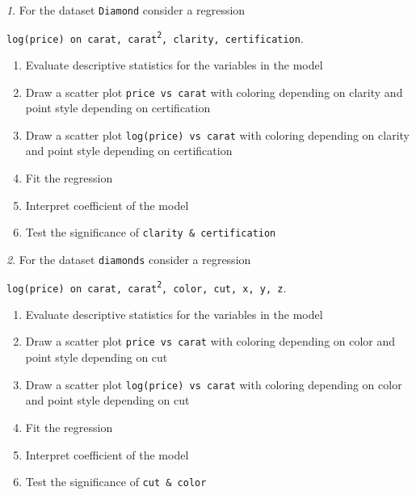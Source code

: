 \documentclass[12pt]{article}
\theoremstyle{remark}
\newtheorem{problem}{}[section]
\begin{document}
\begin{problem}
For the dataset \texttt{Diamond} consider a regression
\begin{center}
	\texttt{log(price) on carat, carat\textsuperscript{2}, clarity, certification}.
\end{center}
\begin{enumerate}
	\item Evaluate descriptive statistics for the variables in the model
	\item Draw a scatter plot \texttt{price vs carat} with coloring 
	depending on clarity and point style depending on certification
	\item Draw a scatter plot \texttt{log(price) vs carat} with coloring 
	depending on clarity and point style depending on certification
	\item Fit the regression
	\item Interpret coefficient of the model
	\item Test the significance of \texttt{clarity \& certification}
\end{enumerate}
\end{problem}

\begin{problem}
For the dataset \texttt{diamonds} consider a regression
\begin{center}
	\texttt{log(price) on carat, carat\textsuperscript{2}, color, cut, x, y, z}.
\end{center}
\begin{enumerate}
	\item Evaluate descriptive statistics for the variables in the model
	\item Draw a scatter plot \texttt{price vs carat} with coloring 
	depending on color and point style depending on cut
	\item Draw a scatter plot \texttt{log(price) vs carat} with coloring 
	depending on color and point style depending on cut
	\item Fit the regression
	\item Interpret coefficient of the model
	\item Test the significance of \texttt{cut \& color}
\end{enumerate}
\end{problem}
\end{document}
